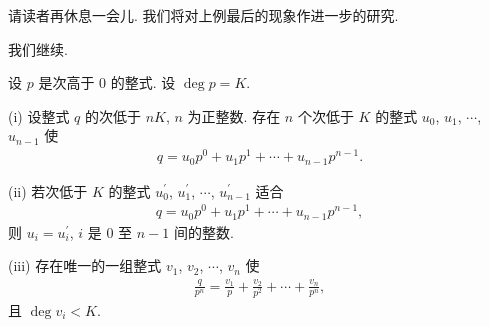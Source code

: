 请读者再休息一会{\scriptsize 儿}. 我们将对上例最后的现象作进一步的研究.

\myLine

我们继续.

\begin{proposition}
    设 $p$ 是次高于 $0$ 的整式. 设 $\deg p = K$.

    (i) 设整式 $q$ 的次低于 $nK$, $n$ 为正整数. 存在 $n$ 个次低于 $K$ 的整式 $u_0$, $u_1$, $\cdots$, $u_{n-1}$ 使
    \begin{align*}
        q = u_0 p^0 + u_1 p^1 + \cdots + u_{n-1} p^{n-1}.
    \end{align*}

    (ii) 若次低于 $K$ 的整式 $u_0^{\prime}$, $u_1^{\prime}$, $\cdots$, $u_{n-1}^{\prime}$ 适合
    \begin{align*}
        q = u_0 p^0 + u_1 p^1 + \cdots + u_{n-1} p^{n-1},
    \end{align*}
    则 $u_i = u_i^{\prime}$, $i$ 是 $0$ 至 $n-1$ 间的整数.

    (iii) 存在唯一的一组整式 $v_1$, $v_2$, $\cdots$, $v_n$ 使
    \begin{align*}
        \frac{q}{p^n} = \frac{v_1}{p} + \frac{v_2}{p^2} + \cdots + \frac{v_n}{p^n},
    \end{align*}
    且 $\deg v_i < K$.
\end{proposition}

